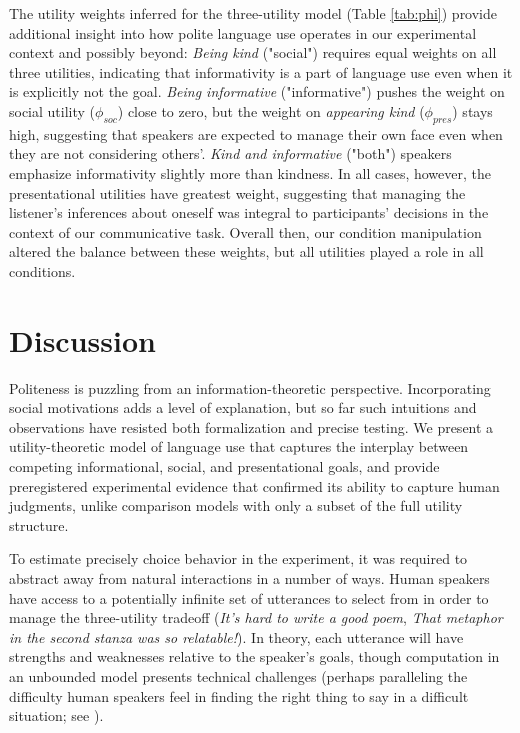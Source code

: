 \documentclass[9pt,twocolumn,twoside,lineno]{main_class_file}
\begin{document}
The utility weights inferred for the three-utility model (Table \ref{tab:phi})
provide additional insight into how polite language use operates in our experimental context and possibly beyond:
\emph{Being kind} ("social") requires equal weights on all three utilities,
indicating that informativity is a part of language use
even when it is explicitly not the goal.
\emph{Being informative} ("informative") pushes
the weight on social utility ($\phi_{soc}$) close to zero, but the weight on 
\emph{appearing kind} ($\phi_{pres}$) stays high, suggesting that speakers are expected
to manage their own face even when they are not considering others'.
\emph{Kind and informative} ("both") speakers emphasize informativity slightly
more than kindness. 
In all cases, however, the presentational utilities have greatest weight, 
suggesting that managing the listener's inferences about oneself was integral to participants' decisions in the context of our  communicative task.
Overall then, our condition manipulation altered the balance between these weights, 
but all utilities played a role in all conditions.

\section*{Discussion}

Politeness is puzzling from an information-theoretic perspective.
Incorporating social motivations adds a level of explanation, but so far such intuitions and observations have resisted both formalization and precise testing.
We present a utility-theoretic model of language use that captures the interplay between competing
informational, social, and presentational goals, and provide preregistered
experimental evidence that confirmed its ability to capture human
judgments, unlike comparison models with only a subset of the full
utility structure.

To estimate precisely choice behavior in the experiment,
it was required to abstract away
from natural interactions in a number of ways.
Human speakers have access
to a potentially infinite set of utterances to select from in order to manage the three-utility tradeoff (\emph{It's hard to write a good poem}, \emph{That
metaphor in the second stanza was so relatable!}). In theory,
each utterance will have strengths and weaknesses relative to the
speaker's goals, though computation in an unbounded model presents
technical challenges (perhaps paralleling the difficulty human speakers
feel in finding the right thing to say in a difficult situation; see \cite{goodman2016}).
\end{document}
